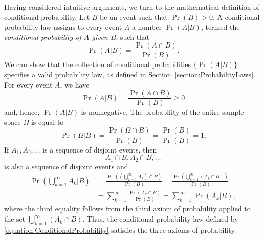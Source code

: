 Having considered intuitive arguments, we turn to the mathematical definition of conditional probability.
Let $B$ be an event such that $\Pr (B) > 0$.
A conditional probability law assigns to every event $A$ a number $\Pr (A|B)$, termed the \emph{conditional probability of $A$ given $B$}, such that 
\begin{equation} \label{equation:ConditionalProbability}
\Pr (A | B) = \frac{\Pr (A \cap B)}{\Pr (B)}.
\end{equation}
We can show that the collection of conditional probabilities $\{ \Pr (A | B) \}$ specifies a valid probability law, as defined in Section~\ref{section:ProbabilityLaws}.
For every event $A$, we have
\begin{equation*}
\Pr (A|B) = \frac{\Pr (A \cap B)}{\Pr (B)} \geq 0
\end{equation*}
and, hence, $\Pr (A|B)$ is nonnegative.
The probability of the entire sample space $\Omega$ is equal to
\begin{equation*}
\Pr (\Omega | B) = \frac{\Pr (\Omega \cap B)}{\Pr (B)}
= \frac{\Pr (B)}{\Pr (B)} = 1 .
\end{equation*}
If $A_1, A_2, \ldots$ is a sequence of disjoint events, then
\begin{equation*}
A_1 \cap B, A_2 \cap B, \ldots
\end{equation*}
is also a sequence of disjoint events and
\begin{equation*}
\begin{split}
\Pr \left( \bigcup_{k=1}^{\infty} A_k \Big| B \right)
&= \frac{\Pr \left( \left( \bigcup_{k=1}^{\infty} A_k \right) \cap B \right)}{\Pr (B)}
= \frac{\Pr \left( \bigcup_{k=1}^{\infty} (A_k \cap B ) \right)}{\Pr (B)} \\
&= \sum_{k = 1}^{\infty} \frac{ \Pr (A_k \cap B ) }{\Pr (B)}
= \sum_{k = 1}^{\infty} \Pr (A_k | B) ,
\end{split}
\end{equation*}
where the third equality follows from the third axiom of probability applied to the set $\bigcup_{k=1}^{\infty} (A_k \cap B )$.
Thus, the conditional probability law defined by \eqref{equation:ConditionalProbability} satisfies the three axioms of probability.

